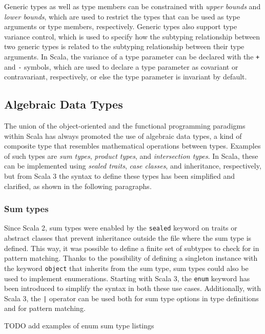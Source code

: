 Generic types as well as type members can be constrained with \textit{upper bounds} and \textit{lower bounds}, which are used to restrict the types that can be used as type arguments or type members, respectively.
%
Generic types also support type variance control, which is used to specify how the subtyping relationship between two generic types is related to the subtyping relationship between their type arguments.
%
In Scala, the variance of a type parameter can be declared with the \texttt{+} and \texttt{-} symbols, which are used to declare a type parameter as covariant or contravariant, respectively, or else the type parameter is invariant by default.

\subsection{Algebraic Data Types}

The union of the object-oriented and the functional programming paradigms within Scala has always promoted the use of algebraic data types, a kind of composite type that resembles mathematical operations between types.
%
Examples of such types are \textit{sum types}, \textit{product types}, and \textit{intersection types}.
%
In Scala, these can be implemented using \textit{sealed traits}, \textit{case classes}, and inheritance, respectively, but from Scala 3 the syntax to define these types has been simplified and clarified, as shown in the following paragraphs.

\subsubsection{Sum types}

Since Scala 2, sum types were enabled by the \texttt{sealed} keyword on traits or abstract classes that prevent inheritance outside the file where the sum type is defined.
%
This way, it was possible to define a finite set of subtypes to check for in pattern matching.
%
Thanks to the possibility of defining a singleton instance with the keyword \texttt{object} that inherits from the sum type, sum types could also be used to implement enumerations.
%
Starting with Scala 3, the \texttt{enum} keyword has been introduced to simplify the syntax in both these use cases.
%
Additionally, with Scala 3, the \texttt{|} operator can be used both for sum type options in type definitions and for pattern matching.

TODO add examples of enum sum type listings


